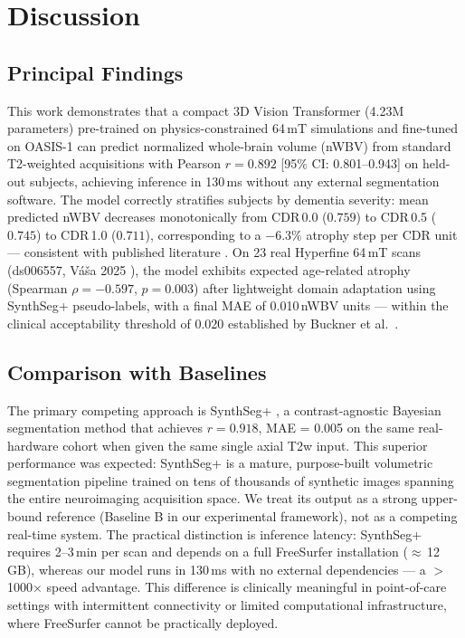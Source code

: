 
\section{Discussion}

\subsection{Principal Findings}

This work demonstrates that a compact 3D Vision Transformer (4.23M parameters)
pre-trained on physics-constrained 64\,mT simulations and fine-tuned on
OASIS-1 can predict normalized whole-brain volume (nWBV) from standard
T2-weighted acquisitions with Pearson $r = 0.892$
[95\% CI: 0.801--0.943] on held-out subjects,
achieving inference in 130\,ms without any external segmentation software.
The model correctly stratifies subjects by dementia severity:
mean predicted nWBV decreases monotonically from CDR\,0.0 ($0.759$) to
CDR\,0.5 ($0.745$) to CDR\,1.0 ($0.711$), corresponding to a $-6.3\%$
atrophy step per CDR unit — consistent with published literature
\cite{fotenos2005,buckner2004}. On 23 real Hyperfine 64\,mT scans
(ds006557, V{\'a}{\v s}a 2025 \cite{vasa2025}), the model exhibits
expected age-related atrophy (Spearman $\rho = -0.597$, $p = 0.003$)
after lightweight domain adaptation using SynthSeg+ pseudo-labels,
with a final MAE of 0.010\,nWBV units — within the clinical
acceptability threshold of 0.020 established by Buckner et al.\
\cite{buckner2004}.

\subsection{Comparison with Baselines}

The primary competing approach is SynthSeg+
\cite{billot2023synthseg}, a contrast-agnostic Bayesian segmentation
method that achieves $r = 0.918$, MAE = 0.005 on the same
real-hardware cohort when given the same single axial T2w input.
This superior performance was expected: SynthSeg+ is a mature,
purpose-built volumetric segmentation pipeline trained on tens of
thousands of synthetic images spanning the entire neuroimaging acquisition
space. We treat its output as a strong upper-bound reference
(Baseline B in our experimental framework), not as a competing
real-time system. The practical distinction is inference latency:
SynthSeg+ requires 2--3\,min per scan and depends on a full
FreeSurfer installation ($\approx$\,12\,GB), whereas our model
runs in 130\,ms with no external dependencies — a $>$1000$\times$
speed advantage. This difference is clinically meaningful in
point-of-care settings with intermittent connectivity or limited
computational infrastructure, where FreeSurfer cannot be practically
deployed.

